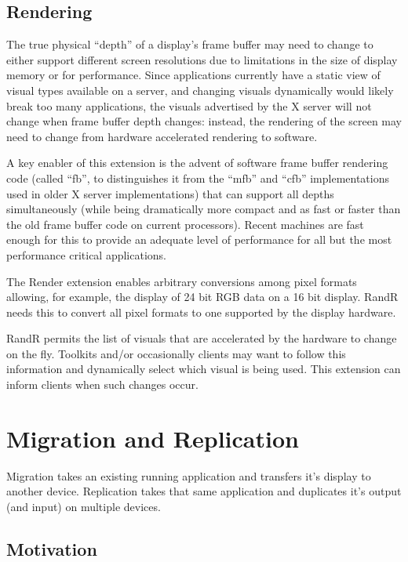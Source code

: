 \documentclass[twocolumn]{article}
\begin{document}
\subsection{Rendering}

The true physical ``depth'' of a display's frame buffer may need to
change to either support different screen resolutions due to
limitations in the size of display memory or for performance. Since
applications currently have a static view of visual types available on
a server, and changing visuals dynamically would likely break too many
applications, the visuals advertised by the X server will not change
when frame buffer depth changes: instead, the rendering of the screen
may need to change from hardware accelerated rendering to software.

A key enabler of this extension is the advent of software frame buffer
rendering code (called ``fb'', to distinguishes it from the ``mfb'' and
``cfb'' implementations used in older X server implementations) that can
support all depths simultaneously (while being dramatically more compact and
as fast or faster than the old frame buffer code on current processors).
Recent machines are fast enough for this to provide an adequate level of
performance for all but the most performance critical applications.  

The Render extension enables arbitrary conversions among pixel formats
allowing, for example, the display of 24 bit RGB data on a 16 bit display.
RandR needs this to convert all pixel formats to one supported by the
display hardware.

RandR permits the list of visuals that are accelerated by the hardware to
change on the fly.  Toolkits and/or occasionally clients may want to 
follow this information and dynamically select which visual is being used.
This extension can inform clients when such changes occur.

\section{Migration and Replication}

Migration takes an existing running application and transfers it's display to
another device.  Replication takes that same application and duplicates it's
output (and input) on multiple devices. 

\subsection{Motivation}
\end{document}
